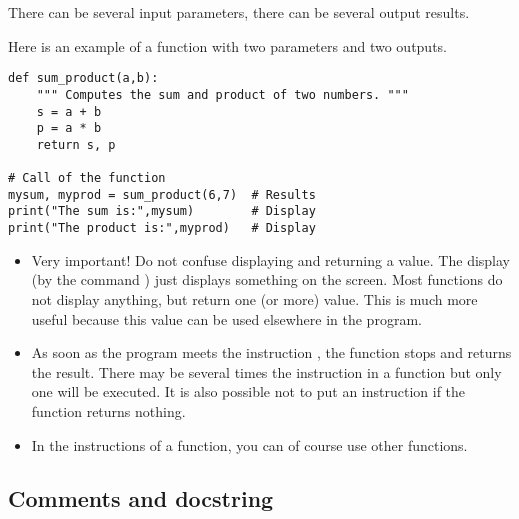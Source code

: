\documentclass[11pt,class=report,crop=false]{standalone}
\begin{document}
There can be several input parameters, there can be several output results.
  


Here is an example of a function with two parameters and two outputs.
\begin{lstlisting}
def sum_product(a,b):
    """ Computes the sum and product of two numbers. """
    s = a + b
    p = a * b
    return s, p

# Call of the function
mysum, myprod = sum_product(6,7)  # Results
print("The sum is:",mysum)        # Display
print("The product is:",myprod)   # Display
\end{lstlisting}

\begin{itemize}
  \item Very important! Do not confuse displaying and returning a value.
  The display (by the command ) just displays something on the screen. Most functions do not display anything, but return one (or more) value. This is much more useful because this value can be used elsewhere in the program.

  
  \item As soon as the program meets the instruction , the function stops and returns the result. There may be several times the instruction  in a function but only one will be executed. It is also possible not to put an instruction  if the function returns nothing.
  
  \item In the instructions of a function, you can of course use other functions.
   
\end{itemize}

\subsection{Comments and docstring}
\end{document}
